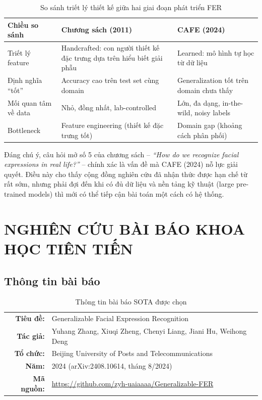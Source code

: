 \documentclass[12pt,a4paper]{article}
\let\oldtextbf\textbf
\renewcommand{\textbf}[1]{\oldtextbf{\textcolor{hcmublue}{#1}}}
\begin{document}
\begin{table}[H]
\centering
\small
\begin{tabular}{|l|p{4.5cm}|p{4.5cm}|}
\hline
\textbf{Chiều so sánh} & \textbf{Chương sách (2011)} & \textbf{CAFE (2024)} \\ \hline
Triết lý feature & Handcrafted: con người thiết kế đặc trưng dựa trên hiểu biết giải phẫu & Learned: mô hình tự học từ dữ liệu \\ \hline
Định nghĩa ``tốt'' & Accuracy cao trên test set cùng domain & Generalization tốt trên domain chưa thấy \\ \hline
Mối quan tâm về data & Nhỏ, đồng nhất, lab-controlled & Lớn, đa dạng, in-the-wild, noisy labels \\ \hline
Bottleneck & Feature engineering (thiết kế đặc trưng tốt) & Domain gap (khoảng cách phân phối) \\ \hline
\end{tabular}
\caption{So sánh triết lý thiết kế giữa hai giai đoạn phát triển FER}
\label{tab:era_comparison}
\end{table}

Đáng chú ý, câu hỏi mở số 5 của chương sách -- \textit{``How do we recognize facial expressions in real life?''} -- chính xác là vấn đề mà CAFE (2024) nỗ lực giải quyết. Điều này cho thấy cộng đồng nghiên cứu đã nhận thức được hạn chế từ rất sớm, nhưng phải đợi đến khi có đủ dữ liệu và nền tảng kỹ thuật (large pre-trained models) thì mới có thể tiếp cận bài toán một cách có hệ thống.

\section{NGHIÊN CỨU BÀI BÁO KHOA HỌC TIÊN TIẾN}

\subsection{Thông tin bài báo}

\begin{table}[H]
\centering
\begin{tabular}{rl}
\textbf{Tiêu đề:}   & Generalizable Facial Expression Recognition \\
\textbf{Tác giả:}   & Yuhang Zhang, Xiuqi Zheng, Chenyi Liang, Jiani Hu, Weihong Deng \\
\textbf{Tổ chức:}   & Beijing University of Posts and Telecommunications \\
\textbf{Năm:}       & 2024 (arXiv:2408.10614, tháng 8/2024) \\
\textbf{Mã nguồn:}  & \url{https://github.com/zyh-uaiaaaa/Generalizable-FER} \\
\end{tabular}
\caption{Thông tin bài báo SOTA được chọn}
\label{tab:paper_info}
\end{table}
\end{document}
